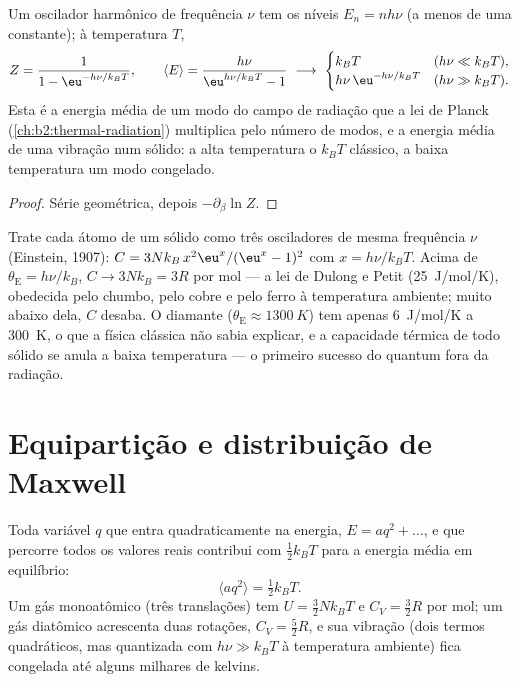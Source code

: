 \begin{proposition}\label{prop:b2:boltzmann-factor:oscillator}
Um oscilador harmônico de frequência $\nu$ tem os níveis $E_n = nh\nu$ (a menos de
uma constante); à temperatura $T$,
\[
Z = \frac{1}{1 - \eu^{-h\nu/k_BT}}, \qquad
\langle E\rangle = \frac{h\nu}{\eu^{h\nu/k_BT} - 1}
\ \longrightarrow\
\begin{cases} k_BT & (h\nu \ll k_BT), \\ h\nu\,\eu^{-h\nu/k_BT} & (h\nu \gg k_BT). \end{cases}
\]
Esta é a energia média de um modo do campo de radiação que a lei de
Planck (\cref{ch:b2:thermal-radiation}) multiplica pelo número de modos,
e a energia média de uma vibração num sólido: a alta temperatura o
$k_BT$ clássico, a baixa temperatura um modo congelado.
\end{proposition}

\begin{proof}
Série geométrica, depois $-\partial_\beta\ln Z$.
\end{proof}

\begin{example}\label{ex:b2:boltzmann-factor:einstein}
Trate cada átomo de um sólido como três osciladores de mesma frequência
$\nu$ (Einstein, 1907): $C = 3Nk_B\,x^2\eu^x/(\eu^x - 1)^2$ com $x =
h\nu/k_BT$. Acima de $\theta_{\text{E}} = h\nu/k_B$, $C \to 3Nk_B = 3R$ por mol
--- a lei de Dulong e Petit (\qty{25}{J/mol/K}), obedecida pelo chumbo,
pelo cobre e pelo ferro à temperatura ambiente; muito abaixo dela, $C$ desaba. O diamante
($\theta_{\text{E}} \approx \qty{1300}{K}$) tem apenas \qty{6}{J/mol/K} a
\qty{300}{K}, o que a física clássica não sabia explicar, e a capacidade térmica
de todo sólido se anula a baixa temperatura --- o primeiro sucesso do
quantum fora da radiação.
\end{example}

\section{Equipartição e distribuição de Maxwell}

\begin{theorem}\label{thm:b2:boltzmann-factor:equipartition}
Toda variável $q$ que entra quadraticamente na energia, $E = aq^2 +
\dots$, e que percorre todos os valores reais contribui com $\tfrac12k_BT$ para
a energia média em equilíbrio:
\[
\langle aq^2\rangle = \tfrac12k_BT .
\]
Um gás monoatômico (três translações) tem $U = \tfrac32Nk_BT$ e $C_V =
\tfrac32R$ por mol; um gás diatômico acrescenta duas rotações, $C_V = \tfrac52R$,
e sua vibração (dois termos quadráticos, mas quantizada com $h\nu \gg
k_BT$ à temperatura ambiente) fica congelada até alguns milhares de kelvins.
\end{theorem}

